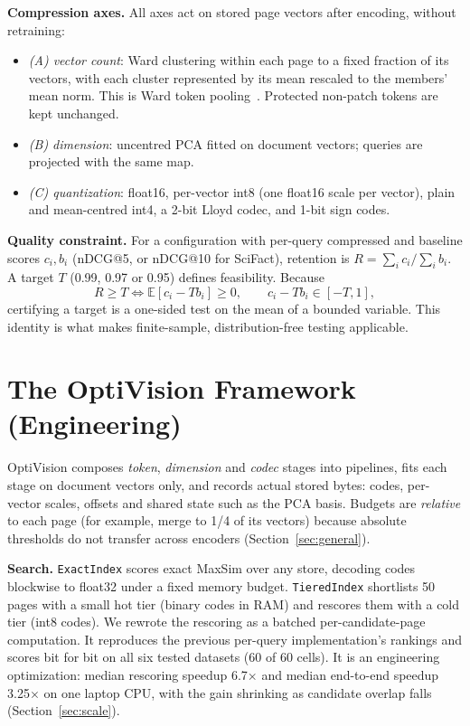\documentclass[conference]{IEEEtran}
\begin{document}
\textbf{Compression axes.} All axes act on stored page vectors after encoding, without
retraining:
\begin{itemize}
\item \emph{(A) vector count}: Ward clustering within each page to a fixed fraction of
its vectors, with each cluster represented by its mean rescaled to the members' mean
norm. This is Ward token pooling~\cite{ward1963,clavie2024pooling}. Protected
non-patch tokens are kept unchanged.
\item \emph{(B) dimension}: uncentred PCA fitted on document vectors; queries are
projected with the same map.
\item \emph{(C) quantization}: float16, per-vector int8 (one float16 scale per vector),
plain and mean-centred int4, a 2-bit Lloyd codec, and 1-bit sign codes.
\end{itemize}

\textbf{Quality constraint.} For a configuration with per-query compressed and baseline
scores $c_i, b_i$ (nDCG@5, or nDCG@10 for SciFact), retention is
$R=\sum_i c_i/\sum_i b_i$. A target $T$ (0.99, 0.97 or 0.95) defines feasibility. Because
\begin{equation}
R \ge T \iff \mathbb{E}[c_i - T b_i] \ge 0,\qquad c_i - T b_i \in [-T, 1],
\label{eq:boundedmean}
\end{equation}
certifying a target is a one-sided test on the mean of a bounded variable. This identity
is what makes finite-sample, distribution-free testing applicable.

\section{The OptiVision Framework (Engineering)}
\label{sec:framework}

OptiVision composes \emph{token}, \emph{dimension} and \emph{codec} stages into
pipelines, fits each stage on document vectors only, and records actual stored bytes:
codes, per-vector scales, offsets and shared state such as the PCA basis. Budgets are
\emph{relative} to each page (for example, merge to 1/4 of its vectors) because absolute
thresholds do not transfer across encoders (Section~\ref{sec:general}).

\textbf{Search.} \texttt{ExactIndex} scores exact MaxSim over any store, decoding codes
blockwise to float32 under a fixed memory budget. \texttt{TieredIndex} shortlists 50
pages with a small hot tier (binary codes in RAM) and rescores them with a cold tier
(int8 codes). We rewrote the rescoring as a batched per-candidate-page computation. It
reproduces the previous per-query implementation's rankings and scores bit for bit on
all six tested datasets (60 of 60 cells). It is an engineering optimization: median
rescoring speedup 6.7$\times$ and median end-to-end speedup 3.25$\times$ on one laptop
CPU, with the gain shrinking as candidate overlap falls (Section~\ref{sec:scale}).
\end{document}
